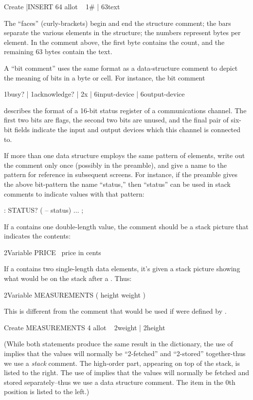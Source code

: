 \begin{Code}
Create |INSERT  64 allot  \  { 1# | 63text }
\end{Code}
The ``faces'' (curly-brackets) begin and end the structure comment;
the bars separate the various elements in the structure; the numbers
represent bytes per element.  In the comment above, the first byte
contains the count, and the remaining 63 bytes contain the text.

A ``bit comment'' uses the same format as a data-structure comment to
depict the meaning of bits in a byte or cell.  For instance, the bit
comment
\begin{Code}
{ 1busy? | 1acknowledge? | 2x | 6input-device |
   6output-device }
\end{Code}
describes the format of a 16-bit status register of a communications
channel.  The first two bits are flags,
the second two bits are unused, and the final pair of six-bit fields
indicate the input and output devices which this channel is connected
to.

If more than one data structure employs the same pattern of elements,
write out the comment only once (possibly in the preamble), and
give a name to the pattern for reference in subsequent screens.  For
instance, if the preamble gives the above bit-pattern the name
``status,'' then ``status'' can be used in stack comments to indicate
values with that pattern:
\begin{Code}
: STATUS?  ( -- status) ... ;
\end{Code}
If a  contains one double-length value, the comment
should be a stack picture that indicates the contents:
\begin{Code}
2Variable PRICE  \ price in cents
\end{Code}
If a  contains two single-length data elements, it's
given a stack picture showing what would be on the stack after a
. Thus:
\begin{Code}
2Variable MEASUREMENTS  ( height weight )
\end{Code}
This is different from the comment that would be used if
 were defined by .
\begin{Code}
Create MEASUREMENTS  4 allot    \ { 2weight | 2height }
\end{Code}
(While both statements produce the same result in the dictionary, the
use of  implies that the values will normally be
``2-fetched'' and ``2-stored'' together-thus we use a \emph{stack}
comment.  The high-order part, appearing on top of the stack, is
listed to the right.  The use of  implies that the
values will normally be fetched and stored separately--thus we use a
data structure comment.  The item in the 0th position is listed to the
left.)%

